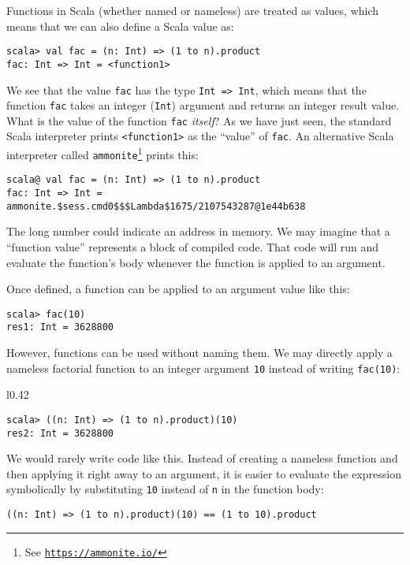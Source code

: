 Functions in Scala (whether named or nameless) are treated as values,
which means that we can also define a Scala value as:
\begin{lstlisting}
scala> val fac = (n: Int) => (1 to n).product
fac: Int => Int = <function1>
\end{lstlisting}
We see that the value \lstinline!fac! has the type \lstinline!Int => Int!,
which means that the function \lstinline!fac! takes an integer (\lstinline!Int!)
argument and returns an integer result value. What is the value of
the function \lstinline!fac! \emph{itself}? As we have just seen,
the standard Scala interpreter prints \lstinline!<function1>! as
the \textsf{``}value\textsf{''} of \lstinline!fac!. An alternative Scala interpreter
called \lstinline!ammonite!\footnote{See \texttt{\href{https://ammonite.io/}{https://ammonite.io/}}}
prints this:
\begin{lstlisting}
scala@ val fac = (n: Int) => (1 to n).product
fac: Int => Int = ammonite.$sess.cmd0$$$Lambda$1675/2107543287@1e44b638
\end{lstlisting}
The long number could indicate an address in memory. We may imagine
that a \textsf{``}function value\textsf{''} represents a block\emph{ }of compiled
code. That code will run and evaluate the function\textsf{'}s body whenever
the function is applied to an argument.

Once defined, a function can be applied to an argument value like
this:
\begin{lstlisting}
scala> fac(10)
res1: Int = 3628800
\end{lstlisting}

However, functions can be used without naming them. We may directly
apply a nameless factorial function to an integer argument \lstinline!10!
instead of writing \lstinline!fac(10)!:

\begin{wrapfigure}{l}{0.42\columnwidth}%
\vspace{-0.8\baselineskip}
\begin{lstlisting}
scala> ((n: Int) => (1 to n).product)(10)
res2: Int = 3628800
\end{lstlisting}

\vspace{-1.5\baselineskip}
\end{wrapfigure}%

\noindent We would rarely write code like this. Instead of creating
a nameless function and then applying it right away to an argument,
it is easier to evaluate the expression symbolically by substituting
\lstinline!10! instead of \lstinline!n! in the function body:
\begin{lstlisting}
((n: Int) => (1 to n).product)(10) == (1 to 10).product
\end{lstlisting}

